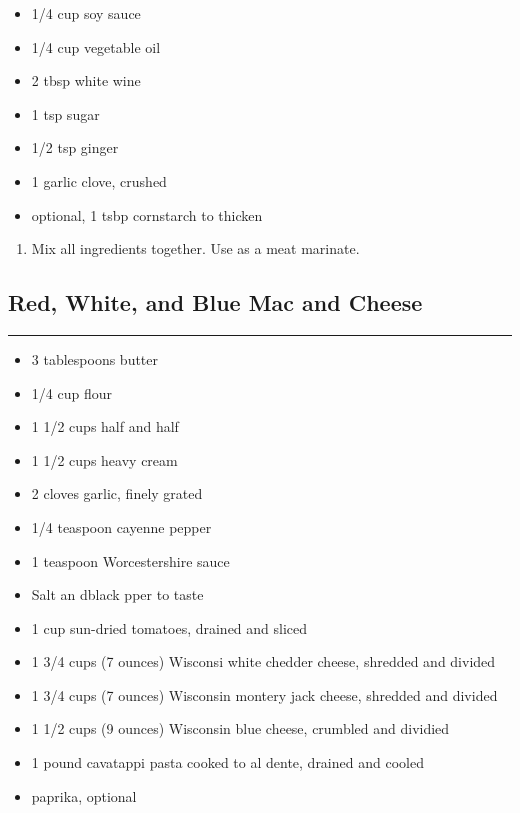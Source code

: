 \documentclass{article}
\begin{document}
\begin{framed}
\begin{itemize}
    \item 1/4 cup soy sauce
    \item 1/4 cup vegetable oil
    \item 2 tbsp white wine
    \item 1 tsp sugar
    \item 1/2 tsp ginger
    \item 1 garlic clove, crushed
    \item optional, 1 tsbp cornstarch to thicken
\end{itemize}
\end{framed}

\begin{enumerate}
    \item 
        Mix all ingredients together. Use as a meat marinate.
\end{enumerate}
\newpage

\subsection{Red, White, and Blue Mac and Cheese} 
\noindent\rule[0.5ex]{\linewidth}{1pt}

\begin{framed}
    \begin{itemize}
        \item 3 tablespoons butter
        \item 1/4 cup flour
        \item 1 1/2 cups half and half
        \item 1 1/2 cups heavy cream
        \item 2 cloves garlic, finely grated
        \item 1/4 teaspoon cayenne pepper
        \item 1 teaspoon Worcestershire sauce
        \item Salt an dblack pper to taste
        \item 1 cup sun-dried tomatoes, drained and sliced
        \item 1 3/4 cups (7 ounces) Wisconsi white chedder cheese, shredded and divided
        \item 1 3/4 cups (7 ounces) Wisconsin montery jack cheese, shredded and divided
        \item 1 1/2 cups (9 ounces) Wisconsin blue cheese, crumbled and dividied
        \item 1 pound cavatappi pasta cooked to al dente, drained and cooled
        \item paprika, optional
    \end{itemize}
\end{framed}
\end{document}
